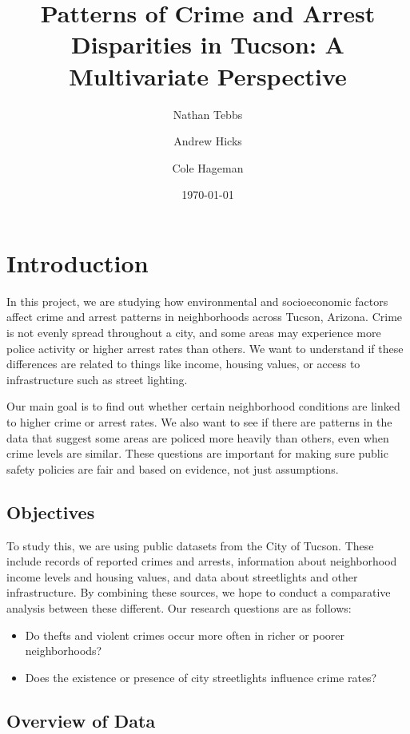 \documentclass{report}
\title{\textbf{Patterns of Crime and Arrest Disparities in Tucson: A Multivariate Perspective}}
\author{Nathan Tebbs \and Andrew Hicks \and Cole Hageman}
\date{\today}
\begin{document}
\maketitle
\tableofcontents

\chapter{Introduction}

In this project, we are studying how environmental and socioeconomic factors affect crime and arrest patterns in neighborhoods across Tucson, Arizona. Crime is not evenly spread throughout a city, and some areas may experience more police activity or higher arrest rates than others. We want to understand if these differences are related to things like income, housing values, or access to infrastructure such as street lighting.

Our main goal is to find out whether certain neighborhood conditions are linked to higher crime or arrest rates. We also want to see if there are patterns in the data that suggest some areas are policed more heavily than others, even when crime levels are similar. These questions are important for making sure public safety policies are fair and based on evidence, not just assumptions.

\newpage
\section{Objectives}

To study this, we are using public datasets from the City of Tucson. These include records of reported crimes and arrests, information about neighborhood income levels and housing values, and data about streetlights and other infrastructure. By combining these sources, we hope to conduct a comparative analysis between these different. Our research questions are as follows:

\begin{itemize}
\item Do thefts and violent crimes occur more often in richer or poorer neighborhoods?
\item Does the existence or presence of city streetlights influence crime rates?
\end{itemize}

\section{Overview of Data}
\end{document}
